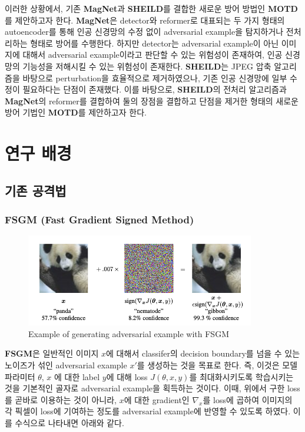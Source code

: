 \documentclass{article}
\begin{document}
이러한 상황에서, 기존 \textbf{MagNet}과 \textbf{SHEILD}를 결합한 새로운 방어 방법인 \textbf{MOTD}를 제안하고자 한다. \textbf{MagNet}은 detector와 reformer로 대표되는 두 가지 형태의 autoencoder를 통해 인공 신경망의 수정 없이 adversarial example을 탐지하거나 전처리하는 형태로 방어를 수행한다. 하지만 detector는 adversarial example이 아닌 이미지에 대해서 adversarial example이라고 판단할 수 있는 위험성이 존재하여, 인공 신경망의 기능성을 저해시킬 수 있는 위험성이 존재한다. \textbf{SHEILD}는 JPEG 압축 알고리즘을 바탕으로 perturbation을 효율적으로 제거하였으나, 기존 인공 신경망에 일부 수정이 필요하다는 단점이 존재했다. 이를 바탕으로, \textbf{SHEILD}의 전처리 알고리즘과 \textbf{MagNet}의 reformer를 결합하여 둘의 장점을 결합하고 단점을 제거한 형태의 새로운 방어 기법인 \textbf{MOTD}를 제안하고자 한다.

 
\section{연구 배경}

\subsection{기존 공격법}


\subsubsection{FSGM (Fast Gradient Signed Method)}

\begin{figure}[h]
    \centering
    \includegraphics[width=10cm]{images/adversarial-example.png}
    \caption{Example of generating adversarial example with FSGM \cite{goodfellow2014explaining}}
\end{figure}

\textbf{FSGM}은 일반적인 이미지 $x$에 대해서 classifer의 decision boundary를 넘을 수 있는 노이즈가 섞인 adversarial example $x'$를 생성하는 것을 목표로 한다. 즉, 이것은 모델 파라미터 $\theta$, $x$ 에 대한 label $y$에 대해 loss $J(\theta, x, y)$를 최대화시키도록 학습시키는 것을 기본적인 골자로 adversarial example을 획득하는 것이다. 이때, 위에서 구한 loss를 곧바로 이용하는 것이 아니라, $x$에 대한 gradient인 $\nabla_x$를 loss에 곱하여 이미지의 각 픽셀이 loss에 기여하는 정도를 adversarial example에 반영할 수 있도록 하였다. 이를 수식으로 나타내면 아래와 같다. \cite{goodfellow2014explaining}
\end{document}
